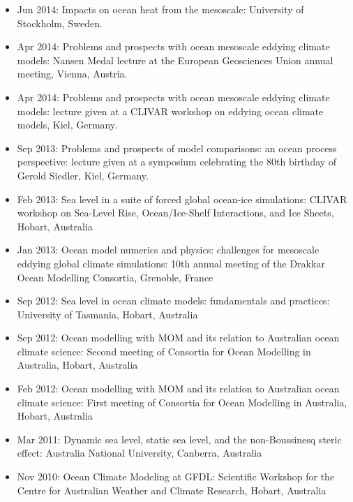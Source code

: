 \documentclass{article}
\begin{document}
\begin{itemize}[leftmargin=*]
\item Jun 2014: {\sc Impacts on ocean heat from the mesoscale}:
  University of Stockholm, Sweden.

\item Apr 2014: {\sc Problems and prospects with ocean mesoscale
    eddying climate models}: Nansen Medal lecture at the European
  Geosciences Union annual meeting, Vienna, Austria.

\item Apr 2014: {\sc Problems and prospects with ocean mesoscale
    eddying climate models}: lecture given at a CLIVAR workshop on
  eddying ocean climate models, Kiel, Germany.

\item Sep 2013: {\sc Problems and prospects of model comparisons: an
    ocean process perspective}: lecture given at a symposium
  celebrating the 80th birthday of Gerold Siedler, Kiel, Germany.

\item Feb 2013: {\sc Sea level in a suite of forced global ocean-ice
    simulations}: CLIVAR workshop on Sea-Level Rise, Ocean/Ice-Shelf
  Interactions, and Ice Sheets, Hobart, Australia

\item Jan 2013: {\sc Ocean model numerics and physics: challenges for
    mesoscale eddying global climate simulations}: 10th annual meeting
  of the Drakkar Ocean Modelling Consortia, Grenoble, France

\item Sep 2012: {\sc Sea level in ocean climate models: fundamentals
    and practices}: University of Tasmania, Hobart, Australia

\item Sep 2012: {\sc Ocean modelling with MOM and its relation to
    Australian ocean climate science}: Second meeting of Consortia for
  Ocean Modelling in Australia, Hobart, Australia

\item Feb 2012: {\sc Ocean modelling with MOM and its relation to
    Australian ocean climate science}: First meeting of Consortia for
  Ocean Modelling in Australia, Hobart, Australia

\item Mar 2011: {\sc Dynamic sea level, static sea level, and the
    non-Boussinesq steric effect}: Australia National University,
  Canberra, Australia

\item Nov 2010:  {\sc Ocean Climate Modeling at GFDL}: Scientific
  Workshop for the Centre for Australian Weather and Climate Research,
  Hobart, Australia


\end{itemize}
\end{document}
